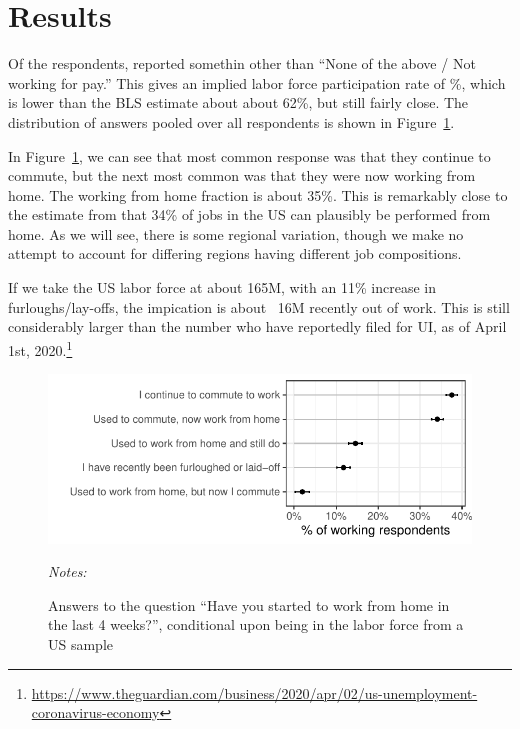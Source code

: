 \documentclass[12pt]{article}
\begin{document}
\section{Results}

Of the respondents, \numObsWorking{} reported somethin other than ``None of the above / Not working for pay.''
This gives an implied labor force participation rate of \LFPRhat{}\%, which is lower than the BLS estimate about about 62\%, but still fairly close.
The distribution of answers pooled over all respondents is shown in Figure~\ref{fig:working_summary}. 

In Figure~\ref{fig:working_summary}, we can see that most common response was that they continue to commute, but the next most common was that they were now working from home. 
The working from home fraction is about 35\%. 
This is remarkably close to the estimate from \cite{dingel2020} that 34\% of jobs in the US can plausibly be performed from home.
As we will see, there is some regional variation, though we make no attempt to account for differing regions having different job compositions. 

If we take the US labor force at about 165M, with an 11\% increase in furloughs/lay-offs, the impication is about ~16M recently out of work.
This is still considerably larger than the number who have reportedly filed for UI, as of April 1st, 2020.\footnote{
  \url{https://www.theguardian.com/business/2020/apr/02/us-unemployment-coronavirus-economy}
}


\begin{figure}
  \caption{Answers to the question ``Have you started to work from home in the last 4 weeks?'', conditional upon being in the labor force from a US sample} \label{fig:working_summary}
\centering
\begin{minipage}{1.0 \linewidth}
  \includegraphics[width = \linewidth]{plots/working_summary.pdf} \\
  \begin{footnotesize}
    \begin{singlespace}
      \emph{Notes:} 
    \end{singlespace}
    \end{footnotesize}
\end{minipage}
\end{figure} 
\end{document}
